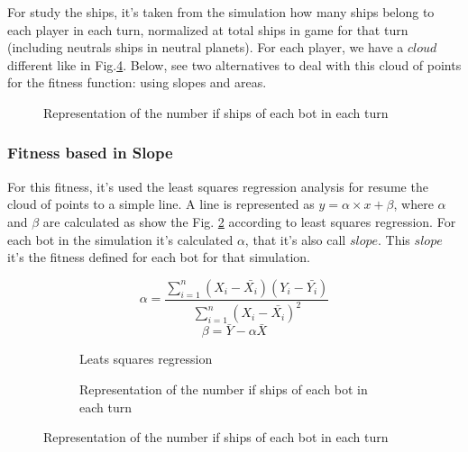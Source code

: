 \documentclass{llncs}
\begin{document}
For study the ships, it's taken from the simulation how many ships belong to each player in each turn, normalized at total ships in game for that turn (including neutrals ships in neutral planets). For each player, we have a {$cloud$} different like in Fig.\ref{figura:nubecita}. Below, see two alternatives to deal with this cloud of points for the fitness function: using slopes and areas.

\begin{figure}[h]
\begin{center}
\end{center}
\caption{Representation of the number if ships of each bot in each turn} 
\label{figura:nubecita}
\end{figure}

\subsubsection{Fitness based in Slope}

For this fitness, it's used the least squares regression analysis for resume the cloud of points to a simple line. A line is represented as {$y = \alpha \times x + \beta $}, where {$\alpha$} and {$\beta$} are calculated as show the Fig. \ref{equation:LeatsSqueares} according to least squares regression. For each bot in the simulation it's calculated $\alpha$, that it's also call $slope$. This $slope$ it's the fitness defined for each bot for that simulation.

\begin{figure}[h]
\begin{subfigure}[H]{0.4\textwidth}
    \begin{equation}
        \alpha = \frac{\sum_{i=1}^{n}(X_{i} - \bar{X_{i}})(Y_{i} - \bar{Y_{i}})}{\sum_{i=1}^{n}(X_{i} - \bar{X_{i}})^{2}}
    \end{equation}
    \begin{equation}
        \beta = \bar{Y}-\alpha\bar{X}
    \end{equation}
    \caption{Leats squares regression}
    \label{equation:LeatsSqueares}
\end{subfigure}
\begin{subfigure}[H]{0.8\textwidth}
\begin{center}
\end{center}
\caption{Representation of the number if ships of each bot in each turn} 
\label{figura:nubecita}
\end{subfigure}
\end{figure}
\end{document}
